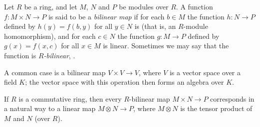 \documentclass[12pt]{article}
\begin{document}

Let $R$ be a ring, and let $M$, $N$ and $P$ be modules over $R$.
A function $f\colon M\times N\to P$
is said to be a \emph{bilinear map}
if for each $b\in M$ the function $h\colon N\to P$
defined by $h(y)=f(b,y)$ for all $y\in N$ is 
(that is, an $R$-module homomorphism),
and for each $c\in N$ the function $g\colon M\to P$
defined by $g(x)=f(x,c)$ for all $x\in M$ is linear.
Sometimes we may say that the function is \emph{$R$-bilinear},
.

A common case is a bilinear map $V\times V\to V$,
where $V$ is a vector space over a field $K$;
the vector space with this operation then forms an algebra over $K$.

If $R$ is a commutative ring, then every $R$-bilinear map $M\times N\to P$
corresponds in a natural way to a linear map $M\otimes N\to P$,
where $M\otimes N$ is the tensor product of $M$ and $N$ (over $R$).
\end{document}
